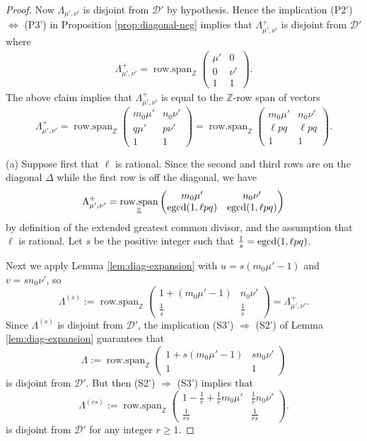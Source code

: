 \documentclass[11pt, letterpaper, reqno]{amsart}
\theoremstyle{definition}
\theoremstyle{remark}
\numberwithin{equation}{section}
\newcommand{\RR}{\ensuremath{\mathbb{R}}}
\newcommand{\ZZ}{\ensuremath{\mathbb{Z}}}
\newcommand{\uu}{{\mu'}}
\newcommand{\vv}{{\nu'}}
\newcommand{\cDprime}{{\mathcal{D}'}}
\newcommand{\muu}{u}
\newcommand{\nuu}{v}
\newcommand{\egcd}{{\rm egcd}}
\DeclareMathOperator{\rowspan}{row.span}
\begin{document}
\begin{proof}
Now $\Lambda_{\uu,\vv}$ is disjoint from $\cDprime$ by hypothesis.
Hence
the implication (P2') $\Leftrightarrow$ (P3') in Proposition \ref{prop:diagonal-neg}
implies that $\Lambda_{\uu,\vv}^+$ is disjoint from $\cDprime$
where
\begin{align*}
\Lambda_{\uu,\vv}^+ = \rowspan_\ZZ\begin{pmatrix}
\uu & 0 \\
0 & \vv \\
1 & 1
\end{pmatrix}.
\end{align*}
The above claim implies that
 $\Lambda^+_{\uu,\vv}$ is equal to the $\ZZ$-row span of  vectors %
\[ \Lambda^+_{\uu,\vv} = \rowspan_\ZZ \begin{pmatrix}
m_0\uu & n_0\vv \\
q\uu & p\vv \\
1 & 1 \end{pmatrix}= \rowspan_\ZZ \begin{pmatrix}
m_0\uu & n_0\vv \\
\ell pq & \ell pq \\
1 & 1 \end{pmatrix} .\]

(a)
Suppose first that $\ell$ is rational.
Since the second and third rows are on the diagonal $\Delta$ while the first row is off the diagonal, 
we have
\[ \Lambda^+_{\uu,\vv} = \rowspan_\ZZ \begin{pmatrix}
m_0\uu & n_0\vv \\
\egcd(1, \ell pq) & \egcd(1,\ell pq) \end{pmatrix}\]
by definition of the extended greatest common divisor,
and the assumption that $\ell$ is rational. %
Let $s$ be the positive integer such that $\frac{1}{s} = \egcd({1},{\ell pq})$.


Next we apply Lemma \ref{lem:diag-expansion}
with  $\muu = s(m_0\uu -1)$ and $\nuu = sn_0\vv$,
so
\[ 
\Lambda^{(s)}
:= \rowspan_\ZZ\begin{pmatrix}
1+ (m_0 \uu-1) & n_0\vv \\
 \frac1{s}  & \frac1{s} \end{pmatrix}
 = \Lambda^+_{\uu,\vv} .
\]
Since $\Lambda^{(s)}$ is disjoint from $\cDprime$,
the implication (S3') $\Rightarrow$ (S2')
of Lemma \ref{lem:diag-expansion}
guarantees that
\[ 
\Lambda := \rowspan_\ZZ\begin{pmatrix}
1+ s(m_0 \uu-1) & sn_0\vv \\
 1  & 1 \end{pmatrix}
\]
is disjoint from $\cDprime$.
But then (S2') $\Rightarrow$ (S3') implies that
\[ 
\Lambda^{(rs)} := \rowspan_\ZZ\begin{pmatrix}
1-\frac{1}{r}+ \frac{1}{r}m_0 \uu & \frac{ 1}{r}n_0\vv \\
 \frac{1}{rs}  & \frac{1}{rs} \end{pmatrix}.
 \]
 is disjoint from $\cDprime$
 for any integer $r\geq 1$.
 


\end{proof}
\end{document}
